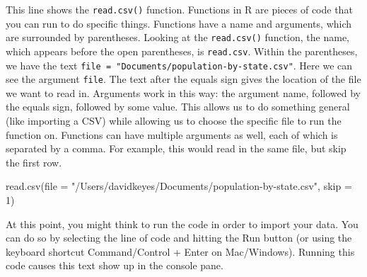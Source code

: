 \documentclass[
]{book}
\newenvironment{Shaded}{\begin{snugshade}}{\end{snugshade}}
\newcommand{\AttributeTok}[1]{\textcolor[rgb]{0.77,0.63,0.00}{#1}}
\newcommand{\DecValTok}[1]{\textcolor[rgb]{0.00,0.00,0.81}{#1}}
\newcommand{\FunctionTok}[1]{\textcolor[rgb]{0.00,0.00,0.00}{#1}}
\newcommand{\NormalTok}[1]{#1}
\newcommand{\StringTok}[1]{\textcolor[rgb]{0.31,0.60,0.02}{#1}}
\begin{document}
This line shows the \texttt{read.csv()} function. Functions in R are pieces of code that you can run to do specific things. Functions have a name and arguments, which are surrounded by parentheses. Looking at the \texttt{read.csv()} function, the name, which appears before the open parentheses, is \texttt{read.csv}. Within the parentheses, we have the text \texttt{file\ =\ "Documents/population-by-state.csv"}. Here we can see the argument \texttt{file}. The text after the equals sign gives the location of the file we want to read in. Arguments work in this way: the argument name, followed by the equals sign, followed by some value. This allows us to do something general (like importing a CSV) while allowing us to choose the specific file to run the function on. Functions can have multiple arguments as well, each of which is separated by a comma. For example, this would read in the same file, but skip the first row.

\begin{Shaded}
\begin{Highlighting}[]
\FunctionTok{read.csv}\NormalTok{(}\AttributeTok{file =} \StringTok{"/Users/davidkeyes/Documents/population{-}by{-}state.csv"}\NormalTok{,}
                 \AttributeTok{skip =} \DecValTok{1}\NormalTok{)}
\end{Highlighting}
\end{Shaded}

At this point, you might think to run the code in order to import your data. You can do so by selecting the line of code and hitting the Run button (or using the keyboard shortcut Command/Control + Enter on Mac/Windows). Running this code causes this text show up in the console pane.
\end{document}
